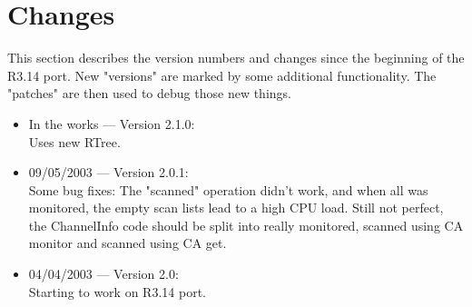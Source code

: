 \section{Changes}

This section describes the version numbers and changes since
the beginning of the R3.14 port.
New  "versions"  are  marked  by some additional functionality. The
"patches" are then used to debug those new things.

\begin{itemize}

\item In the works --- Version 2.1.0:\\
Uses new RTree.

\item 09/05/2003 --- Version 2.0.1:\\
Some bug fixes:
The  "scanned"  operation didn't work, and when all was monitored,
the  empty  scan lists lead to a high CPU load. Still not perfect,
the  ChannelInfo  code  should  be  split  into  really monitored,
scanned using CA monitor and scanned using CA get.

\item 04/04/2003 --- Version 2.0:\\
Starting to work on R3.14 port.
\end{itemize}
